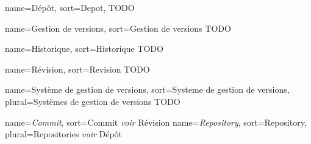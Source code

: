 
{
name=Dépôt,
sort=Depot,
}
{TODO}

{
name=Gestion de versions,
sort=Gestion de versions
}
{TODO}

{
name=Historique,
sort=Historique
}
{TODO}

{
name=Révision,
sort=Revision
}
{TODO}

{
  name=Système de gestion de versions,
  sort=Systeme de gestion de versions,
  plural=Systèmes de gestion de versions
}
{TODO}

{
name={\it Commit\/},
sort=Commit
}
{{\it voir\/} Révision}
{
  name={\it Repository\/},
  sort=Repository,
  plural=Repositories
}
{{\it voir\/} Dépôt}